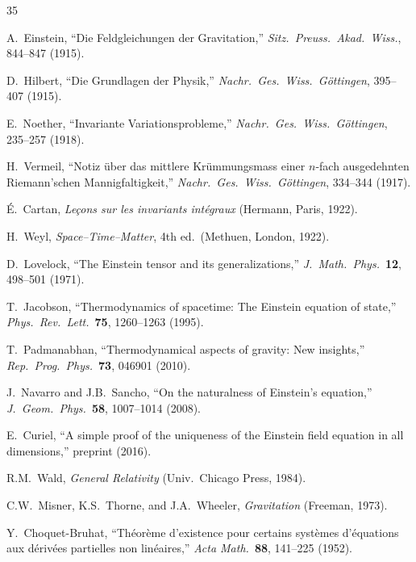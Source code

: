 \documentclass[12pt]{article}
\theoremstyle{plain}
\theoremstyle{definition}
\theoremstyle{remark}
\begin{document}
\begin{thebibliography}{35}

 A.~Einstein, ``Die Feldgleichungen der Gravitation,'' \emph{Sitz.\ Preuss.\ Akad.\ Wiss.}, 844--847 (1915).

 D.~Hilbert, ``Die Grundlagen der Physik,'' \emph{Nachr.\ Ges.\ Wiss.\ G\"ottingen}, 395--407 (1915).

 E.~Noether, ``Invariante Variationsprobleme,'' \emph{Nachr.\ Ges.\ Wiss.\ G\"ottingen}, 235--257 (1918).

 H.~Vermeil, ``Notiz \"uber das mittlere Kr\"ummungsmass einer $n$-fach ausgedehnten Riemann'schen Mannigfaltigkeit,'' \emph{Nachr.\ Ges.\ Wiss.\ G\"ottingen}, 334--344 (1917).

 \'E.~Cartan, \emph{Le\c{c}ons sur les invariants int\'egraux} (Hermann, Paris, 1922).

 H.~Weyl, \emph{Space--Time--Matter}, 4th ed.\ (Methuen, London, 1922).

 D.~Lovelock, ``The Einstein tensor and its generalizations,'' \emph{J.\ Math.\ Phys.}\ \textbf{12}, 498--501 (1971).

 T.~Jacobson, ``Thermodynamics of spacetime: The Einstein equation of state,'' \emph{Phys.\ Rev.\ Lett.}\ \textbf{75}, 1260--1263 (1995).

 T.~Padmanabhan, ``Thermodynamical aspects of gravity: New insights,'' \emph{Rep.\ Prog.\ Phys.}\ \textbf{73}, 046901 (2010).

 J.~Navarro and J.B.~Sancho, ``On the naturalness of Einstein's equation,'' \emph{J.\ Geom.\ Phys.}\ \textbf{58}, 1007--1014 (2008).

 E.~Curiel, ``A simple proof of the uniqueness of the Einstein field equation in all dimensions,'' preprint (2016).

 R.M.~Wald, \emph{General Relativity} (Univ.\ Chicago Press, 1984).

 C.W.~Misner, K.S.~Thorne, and J.A.~Wheeler, \emph{Gravitation} (Freeman, 1973).

 Y.~Choquet-Bruhat, ``Th\'eor\`eme d'existence pour certains syst\`emes d'\'equations aux d\'eriv\'ees partielles non lin\'eaires,'' \emph{Acta Math.}\ \textbf{88}, 141--225 (1952).


\end{thebibliography}
\end{document}
